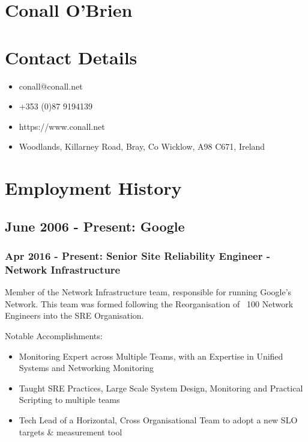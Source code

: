 \documentclass[a4paper, 10pt] {article}
\begin{document}
\section*{Conall O'Brien}

\section*{Contact Details}

\begin{itemize}
 \item conall@conall.net
 \item +353 (0)87 9194139
 \item https://www.conall.net
 \item Woodlands, Killarney Road, Bray, Co Wicklow, A98 C671, Ireland
\end{itemize}

\section*{Employment History}

\subsection*{June 2006 - Present: Google}

\subsubsection*{Apr 2016 - Present: Senior Site Reliability Engineer - Network Infrastructure}

Member of the Network Infrastructure team, responsible for running Google's Network. This team was formed
following the Reorganisation of ~100 Network Engineers into the SRE Organisation.

\vspace{5mm} %

Notable Accomplishments:

\begin{itemize}
  \item Monitoring Expert across Multiple Teams, with an Expertise in Unified Systems and Networking Monitoring
  \item Taught SRE Practices, Large Scale System Design, Monitoring and Practical Scripting to multiple teams
  \item Tech Lead of a Horizontal, Cross Organisational Team to adopt a new SLO targets \& measurement tool
\end{itemize}
\end{document}
